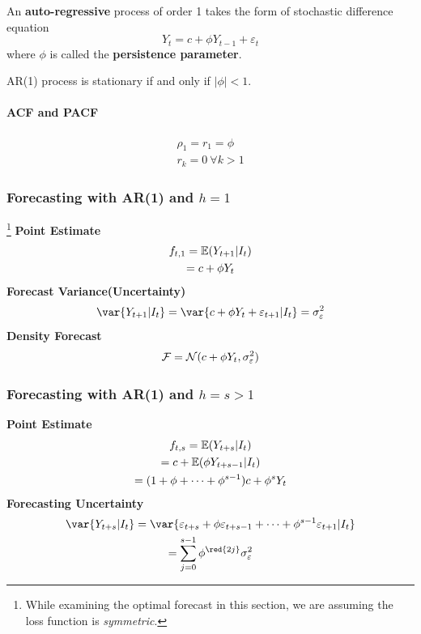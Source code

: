 \documentclass[11pt]{article}
\begin{document}
			\begin{definition}
				An \textbf{auto-regressive} process of order 1 takes the form of stochastic difference equation
				\begin{equation}
					Y_t = c + \phi Y_{t-1} + \varepsilon_t
				\end{equation}
				where $\phi$ is called the \textbf{persistence parameter}.
			\end{definition}
		
		\begin{proposition}
			AR(1) process is stationary if and only if $|\phi| < 1$.
		\end{proposition}
		
		\paragraph{ACF and PACF}
			\begin{gather}
				\rho_1 = r_1 = \phi \\
				r_k = 0\ \forall k > 1
			\end{gather}
			
		\subsubsection{Forecasting with AR(1) and $h=1$}\footnote{While examining the optimal forecast in this section, we are assuming the loss function is \emph{symmetric}.}
			\textbf{Point Estimate}
				\begin{gather}
					f_{t,1} = \mathbb{E}({Y_{t+1}|I_t}) \\
					= c + \phi Y_t
				\end{gather}
			\textbf{Forecast Variance(Uncertainty)}
				\begin{gather}
					\var{Y_{t+1}|I_t} = \var{c + \phi Y_t + \varepsilon_{t+1}|I_t}
					= \sigma_\varepsilon^2
				\end{gather}
			\textbf{Density Forecast}
				\begin{gather}
					\mathcal{{F}} = \mathcal{{N}}(c + \phi Y_t, \sigma_\varepsilon^2)
				\end{gather}
		\subsubsection{Forecasting with AR(1) and $h=s>1$}
			\textbf{Point Estimate}
				\begin{gather}
					f_{t,s} = \mathbb{E}({Y_{t+s}|I_t}) \\
					= c + \mathbb{E}({\phi Y_{t+s-1}|I_t}) \\
					= (1 + \phi + \dots + \phi^{s-1}) c + \phi^s Y_t
				\end{gather}
			\textbf{Forecasting Uncertainty}
				\begin{gather}
					\var{Y_{t+s}|I_t} = \var{\varepsilon_{t+s} + \phi \varepsilon_{t+s-1} + \dots + \phi^{s-1} \varepsilon_{t+1} | I_t} \\
					= \sum_{j=0}^{s-1} \phi^{\red{2j}} \sigma_\varepsilon^2
				\end{gather}
\end{document}

